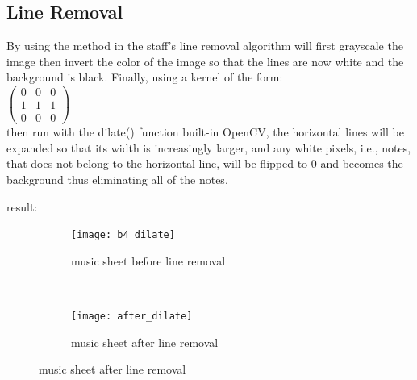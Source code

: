 \documentclass[a4paper,12pt]{report}
\begin{document}
\subsection{Line Removal}
By using the method in \textcite{Gomez2017} the staff's line removal algorithm
will first grayscale the image then invert the color of the image so that the
lines are now white and the background is black. Finally, using a kernel of the
form: \\
$
\begin{pmatrix}
	0 & 0 & 0\\
	1 & 1 & 1\\
	0 & 0 & 0
\end{pmatrix}
$\\
then run with the dilate() function built-in OpenCV, the horizontal lines will
be expanded so that its width is increasingly larger, and any white pixels, i.e.,
notes, that does not belong to the horizontal line, will be flipped to 0 and
becomes the background thus eliminating all of the notes.

result:
\begin{figure}[H]
    \centering
    \begin{subfigure}[t]{0.5\textwidth}
        \centering
        \texttt{[image: b4\_dilate]}
        \caption{music sheet before line removal}
    \end{subfigure}%
    ~ 
    \begin{subfigure}[t]{0.5\textwidth}
        \centering
        \texttt{[image: after\_dilate]}
        \caption{music sheet after line removal}
    \end{subfigure}
\end{figure}
\end{document}

